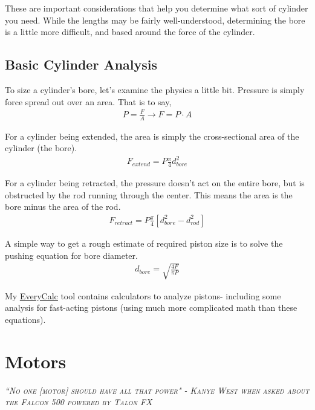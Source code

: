 These are important considerations that help you determine what sort of cylinder you need. While the lengths may be fairly well-understood, determining the bore is a little more difficult, and based around the force of the cylinder.

\section{Basic Cylinder Analysis}

To size a cylinder's bore, let's examine the physics a little bit. Pressure is simply force spread out over an area. That is to say,
\begin{align}
	P = \frac{F}{A} \rightarrow F = P \cdot A
\end{align}

For a cylinder being extended, the area is simply the cross-sectional area of the cylinder (the bore).
\begin{align}
	F_{extend} = P \frac{\pi}{4} d_{bore}^2
\end{align}

For a cylinder being retracted, the pressure doesn't act on the entire bore, but is obstructed by the rod running through the center. This means the area is the bore minus the area of the rod.
\begin{align}
	F_{retract} = P \frac{\pi}{4} [ d_{bore}^2 - d_{rod}^2 ]
\end{align}

A simple way to get a rough estimate of required piston size is to solve the pushing equation for bore diameter.
\begin{align}
	d_{bore} = \sqrt{\frac{4 F}{\pi P}}
\end{align}

My \href{http://thaddeus-maximus.github.io/swissarmyengineer/}{\color{red}\underline{EveryCalc}} tool contains calculators to analyze pistons- including some analysis for fast-acting pistons (using much more complicated math than these equations).

\chapter{Motors}

 {\slshape \scshape ``No one [motor] should have all that power" - Kanye West when asked about the Falcon 500 powered by Talon FX}
 \\ %
 
